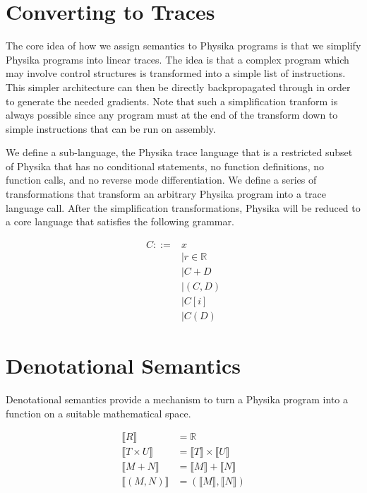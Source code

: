 \documentclass[book.tex]{subfiles}
\begin{document}
\section{Converting to Traces}

The core idea of how we assign semantics to Physika programs is that we simplify Physika programs into linear traces. The idea is that a complex program which may involve control structures is transformed into a simple list of instructions. This simpler architecture can then be directly backpropagated through in order to generate the needed gradients. Note that such a simplification tranform is always possible since any program must at the end of the transform down to simple instructions that can be run on assembly.

We define a sub-language, the Physika trace language that is a restricted subset of Physika that has no conditional statements, no function definitions, no function calls, and no reverse mode differentiation. We define a series of transformations that transform an arbitrary Physika program into a trace language call. After the simplification transformations, Physika will be reduced to a core language that satisfies the following grammar.

\begin{align}
    C ::= & x  \\
    &| r \in \mathbb{R} \\
    &| C + D \\
    &| (C, D) \\
    &| C[i]   \\
    &| C(D)
\end{align}

\section{Denotational Semantics}

Denotational semantics provide a mechanism to turn a Physika program into a function on a suitable mathematical space.

\begin{align}
    \llbracket R \rrbracket &= \mathbb{R} \\
    \llbracket T \times U \rrbracket &= \llbracket T \rrbracket \times \llbracket U \rrbracket \\
    \llbracket M + N \rrbracket &= \llbracket M \rrbracket + \llbracket N \rrbracket \\
    \llbracket (M, N) \rrbracket &= (\llbracket M \rrbracket, \llbracket N \rrbracket)
\end{align}
\end{document}
